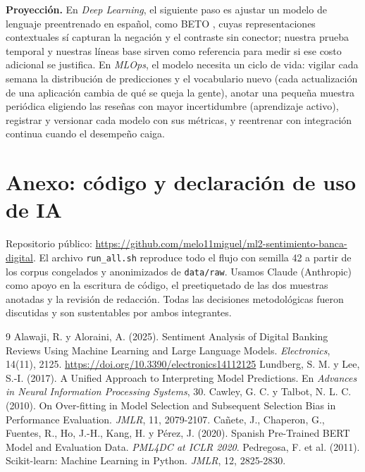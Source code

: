 \documentclass[11pt,a4paper]{article}
\begin{document}
\textbf{Proyección.} En \textit{Deep Learning}, el siguiente paso es ajustar un modelo de lenguaje
preentrenado en español, como BETO \cite{beto}, cuyas representaciones contextuales sí capturan la
negación y el contraste sin conector; nuestra prueba temporal y nuestras líneas base sirven como
referencia para medir si ese costo adicional se justifica. En \textit{MLOps}, el modelo necesita un
ciclo de vida: vigilar cada semana la distribución de predicciones y el vocabulario nuevo (cada
actualización de una aplicación cambia de qué se queja la gente), anotar una pequeña muestra
periódica eligiendo las reseñas con mayor incertidumbre (aprendizaje activo), registrar y versionar
cada modelo con sus métricas, y reentrenar con integración continua cuando el desempeño caiga.

\section*{Anexo: código y declaración de uso de IA}
\small
Repositorio público: \url{https://github.com/melo11miguel/ml2-sentimiento-banca-digital}. El
archivo \texttt{run\_all.sh} reproduce todo el flujo con semilla 42 a partir de los corpus congelados
y anonimizados de \texttt{data/raw}. Usamos Claude (Anthropic) como apoyo en la escritura de
código, el preetiquetado de las dos muestras anotadas y la revisión de redacción. Todas las
decisiones metodológicas fueron discutidas y son sustentables por ambos integrantes.

\begin{thebibliography}{9}\small
{} Alawaji, R. y Aloraini, A. (2025). Sentiment Analysis of Digital Banking
Reviews Using Machine Learning and Large Language Models. \textit{Electronics}, 14(11), 2125.
\url{https://doi.org/10.3390/electronics14112125}
 Lundberg, S. M. y Lee, S.-I. (2017). A Unified Approach to Interpreting Model
Predictions. En \textit{Advances in Neural Information Processing Systems}, 30.
 Cawley, G. C. y Talbot, N. L. C. (2010). On Over-fitting in Model Selection and
Subsequent Selection Bias in Performance Evaluation. \textit{JMLR}, 11, 2079-2107.
 Cañete, J., Chaperon, G., Fuentes, R., Ho, J.-H., Kang, H. y Pérez, J. (2020).
Spanish Pre-Trained BERT Model and Evaluation Data. \textit{PML4DC at ICLR 2020}.
 Pedregosa, F. et al. (2011). Scikit-learn: Machine Learning in Python.
\textit{JMLR}, 12, 2825-2830.
\end{thebibliography}
\end{document}
